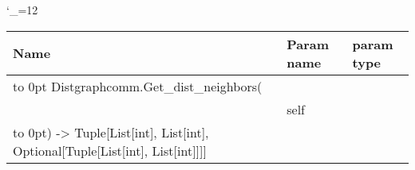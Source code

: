 \begingroup \catcode`\_=12 \tt
\begin{tabular}{lll}
\toprule
\textrm{Name}&\textrm{Param name}&\textrm{param type}\\
\midrule
\hbox to 0pt {Distgraphcomm.Get_dist_neighbors(\hss}\\
& self\\
\hbox to 0pt{) -> Tuple[List[int], List[int], Optional[Tuple[List[int], List[int]]]]\hss}\\
\bottomrule
\end{tabular}
\endgroup
